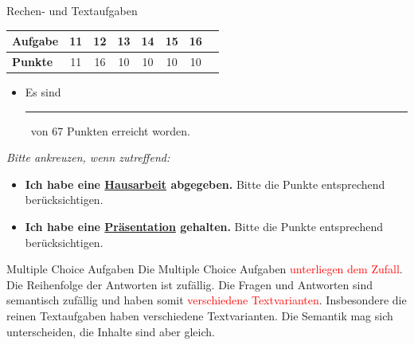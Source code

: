 \documentclass[a4paper, 9pt]{scrartcl}\usepackage[]{graphicx}\usepackage[]{xcolor}
\begin{document}
\begin{graybox}{Rechen- und Textaufgaben}
\vspace{2Ex}
  \begin{center}
    \Large
    \begin{tabular}{|l|c|c|c|c|c|c|c|}
      \hline
      \textbf{Aufgabe} & \textbf{11} & \textbf{12} & \textbf{13} & \textbf{14} & \textbf{15} & \textbf{16} \strut\\
      \hline
      \textbf{Punkte} & 
      \hspace{1Ex}\huge\textcolor{gray!70}{11}\hspace{1Ex}  & 
      \hspace{1Ex}\huge\textcolor{gray!70}{16}\hspace{1Ex}  & 
      \hspace{1Ex}\huge\textcolor{gray!70}{10}\hspace{1Ex}  & 
      \hspace{1Ex}\huge\textcolor{gray!70}{10}\hspace{1Ex}  & 
      \hspace{1Ex}\huge\textcolor{gray!70}{10}\hspace{1Ex}  & 
      \hspace{1Ex}\huge\textcolor{gray!70}{10}\hspace{1Ex}  \strut\\
      \hline
  \end{tabular}
\end{center}
\vspace{2Ex}
\begin{itemize}
\item Es sind \rule[0ex]{2em}{.4pt}\, von 67 Punkten erreicht worden.
\end{itemize}
\vspace{2Ex}
\textit{Bitte ankreuzen, wenn zutreffend:}
\begin{itemize}
\item [\msquare] \textbf{Ich habe eine \uline{Hausarbeit} abgegeben.} Bitte die Punkte entsprechend berücksichtigen.
\item [\msquare] \textbf{Ich habe eine \uline{Präsentation} gehalten.} Bitte die Punkte entsprechend berücksichtigen.
\end{itemize}
\end{graybox}

\clearpage
\begin{graybox}{Multiple Choice Aufgaben}
Die Multiple Choice Aufgaben \textcolor{red}{unterliegen dem Zufall}. Die Reihenfolge der Antworten ist zufällig. Die Fragen und Antworten sind semantisch zufällig und haben somit \textcolor{red}{verschiedene Textvarianten}. Insbesondere die reinen Textaufgaben haben verschiedene Textvarianten. Die Semantik mag sich unterscheiden, die Inhalte sind aber gleich.
\end{graybox}
\end{document}
